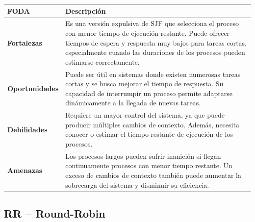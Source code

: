 \begin{center}
\begin{tabular}{|p{}|p{}|}
\hline
\textbf{FODA} & \textbf{Descripción} \\ \hline

\textbf{Fortalezas} &
Es una versión expulsiva de SJF que selecciona el proceso con menor tiempo de ejecución restante. Puede ofrecer tiempos de espera y respuesta muy bajos para tareas cortas, especialmente cuando las duraciones de los procesos pueden estimarse correctamente. \\ \hline

\textbf{Oportunidades} &
Puede ser útil en sistemas donde existen numerosas tareas cortas y se busca mejorar el tiempo de respuesta. Su capacidad de interrumpir un proceso permite adaptarse dinámicamente a la llegada de nuevas tareas. \\ \hline

\textbf{Debilidades} &
Requiere un mayor control del sistema, ya que puede producir múltiples cambios de contexto. Además, necesita conocer o estimar el tiempo restante de ejecución de los procesos. \\ \hline

\textbf{Amenazas} &
Los procesos largos pueden sufrir inanición si llegan continuamente procesos con menor tiempo restante. Un exceso de cambios de contexto también puede aumentar la sobrecarga del sistema y disminuir su eficiencia. \\ \hline

\end{tabular}
\end{center}

\subsection{RR -- Round-Robin}

